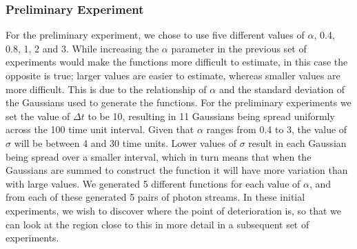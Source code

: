 \documentclass[a4paper,11pt]{article}
\begin{document}
\subsubsection{Preliminary Experiment}
\label{sec-8-2-1}

For the preliminary experiment, we chose to use five different values of
$\alpha$, 0.4, 0.8, 1, 2 and 3. While increasing the $\alpha$ parameter in the
previous set of experiments would make the functions more difficult to estimate,
in this case the opposite is true; larger values are easier to estimate, whereas
smaller values are more difficult. This is due to the relationship of $\alpha$
and the standard deviation of the Gaussians used to generate the functions. For
the preliminary experiments we set the value of $\Delta t$ to be 10, resulting
in 11 Gaussians being spread uniformly across the 100 time unit interval. Given
that $\alpha$ ranges from 0.4 to 3, the value of $\sigma$ will be between 4 and
30 time units. Lower values of $\sigma$ result in each Gaussian being spread
over a smaller interval, which in turn means that when the Gaussians are summed
to construct the function it will have more variation than with large values. We
generated 5 different functions for each value of $\alpha$, and from each of
these generated 5 pairs of photon streams. In these initial experiments, we wish
to discover where the point of deterioration is, so that we can look at the
region close to this in more detail in a subsequent set of experiments.
\end{document}
